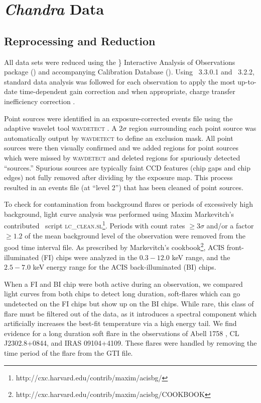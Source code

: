\section{{\it Chandra} Data}
\label{sec:ebanddata}

\subsection{Reprocessing and Reduction}
\label{sec:ebandreprocessing}

All data sets were reduced using the \chandra\} Interactive Analysis
of Observations package (\ciao) and accompanying Calibration Database
(\caldb). Using \ciao\ 3.3.0.1 and \caldb\ 3.2.2, standard data
analysis was followed for each observation to apply the most
up-to-date time-dependent gain correction and when appropriate, charge
transfer inefficiency correction \citep{2000ApJ...534L.139T}.

Point sources were identified in an exposure-corrected events file
using the adaptive wavelet tool {\textsc{wavdetect}}
\citep{2002ApJS..138..185F}. A $2 \sigma$ region surrounding each
point source was automatically output by {\textsc{wavdetect}} to
define an exclusion mask.  All point sources were then visually
confirmed and we added regions for point sources which were missed by
{\textsc{wavdetect}} and deleted regions for spuriously detected
``sources.'' Spurious sources are typically faint CCD features (chip
gaps and chip edges) not fully removed after dividing by the exposure
map. This process resulted in an events file (at ``level 2'') that has
been cleaned of point sources.

To check for contamination from background flares or periods of
excessively high background, light curve analysis was performed using
Maxim Markevitch's contributed \ciao\ script
{\textsc{lc\_clean.sl}}\footnote{http://cxc.harvard.edu/contrib/maxim/acisbg/}.
Periods with count rates $\geq 3\sigma$ and/or a factor $\geq 1.2$ of
the mean background level of the observation were removed from the
good time interval file. As prescribed by Markevitch's
cookbook\footnote{http://cxc.harvard.edu/contrib/maxim/acisbg/COOKBOOK},
ACIS front-illuminated (FI) chips were analyzed in the $0.3-12.0$ keV
range, and the $2.5-7.0$ keV energy range for the ACIS
back-illuminated (BI) chips.

When a FI and BI chip were both active during an observation, we
compared light curves from both chips to detect long duration,
soft-flares which can go undetected on the FI chips but show up on the
BI chips. While rare, this class of flare must be filtered out of the
data, as it introduces a spectral component which artificially
increases the best-fit temperature via a high energy tail. We find
evidence for a long duration soft flare in the observations of Abell
1758 \citep{2004ApJ...613..831D}, CL J2302.8+0844, and IRAS
09104+4109. These flares were handled by removing the time period of
the flare from the GTI file.

